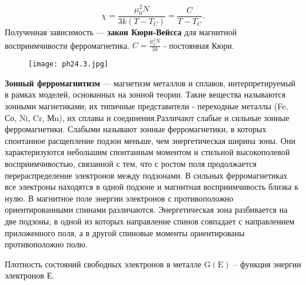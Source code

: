 $$
\chi=\frac{\mu_0^2 N}{3 k\left(T-T_C\right)}=\frac{C}{T-T_C}.
$$
Полученная зависимость --- \textbf{закон Кюри-Вейсса} для магнитной восприимчивости ферромагнетика. $C=\frac{\mu_0^2 N}{3 k}$ - постоянная Кюри.
\begin{figure}[h!]
\centering
    \texttt{[image: ph24.3.jpg]}
\end{figure}

\textbf{Зонный ферромагнитизм} --- магнетизм металлов и сплавов, интерпретируемый в рамках
моделей, основанных на зонной теории. Такие вещества называются зонными магнетиками; их типичные представители - переходные металлы (Fe, Со, Ni, Cr, Мn), их сплавы и соединения.Различают слабые и сильные зонные ферромагнетики. Слабыми называют зонные ферромагнетики, в которых спонтанное расщепление подзон меньше, чем энергетическая ширина зоны. Они характеризуются небольшим спонтанным моментом и стильной высокополевой восприимчивостью, связанной с тем, что с ростом поля продолжается перераспределение электронов между подзонами. В сильных ферромагнетиках все электроны находятся в одной подзоне и магнитная восприимчивость близка к нулю. В магнитное поле энергии электронов с противоположно ориентированными спинами различаются. Энергетическая зона разбивается на две подзоны, в одной из которых направление спинов совпадает с направлением приложенного поля, а в другой спиновые моменты ориентированы противоположно полю.


Плотность состояний свободных электронов в металле $\mathrm{G(E)}$ -- функция энергии электронов Е.


